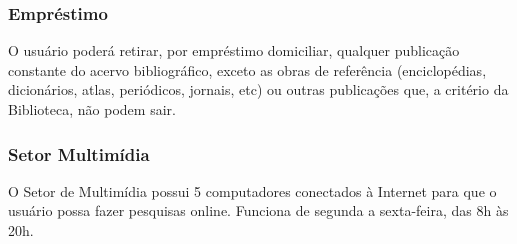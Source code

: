 %
%
%
%

\subsubsection{Empréstimo}
O usuário poderá retirar, por empréstimo domiciliar, qualquer publicação constante do acervo bibliográfico, exceto as
obras de referência (enciclopédias, dicionários, atlas, periódicos, jornais, etc) ou outras publicações que, a critério
da Biblioteca, não podem sair.

\subsubsection{Setor Multimídia}
O Setor de Multimídia possui 5 computadores conectados à Internet para que o usuário possa fazer pesquisas online.
Funciona de segunda a sexta-feira, das 8h às 20h.

